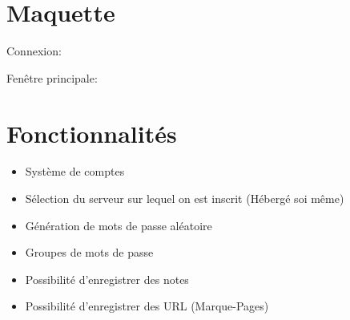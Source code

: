 \documentclass[oneside]{report}
\begin{document}
	\section{Maquette}
	{
		\par Connexion:\\
		\noindent{}
		\par Fenêtre principale:\\
		\noindent{}
	}

	\section{Fonctionnalités}
	{
		\begin{itemize}
			\item Système de comptes
			\item Sélection du serveur sur lequel on est inscrit (Hébergé soi même)
			\item Génération de mots de passe aléatoire
			\item Groupes de mots de passe
			\item Possibilité d'enregistrer des notes
			\item Possibilité d'enregistrer des URL (Marque-Pages)
		\end{itemize}
	}
\end{document}
